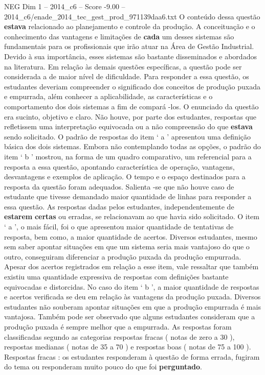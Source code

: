 \begin{textsample}{NEG Dim 1 – 2014\_c6 – Score -9.00 – 2014\_c6/enade\_2014\_tec\_gest\_prod\_971139daa6.txt}
O conteúdo dessa questão \textbf{estava} relacionado ao planejamento e controle da produção.
A conceituação e o conhecimento das vantagens e limitações de \textbf{cada} um desses sistemas são fundamentais para os profissionais que irão atuar na Área de Gestão Industrial.
Devido à sua importância, esses sistemas são bastante disseminados e abordados na literatura.
Em relação às demais questões específicas, a questão pode ser considerada a de maior nível de dificuldade.
Para responder a essa questão, os estudantes deveriam compreender o significado dos conceitos de produção puxada e empurrada, além conhecer a aplicabilidade, as características e o comportamento dos dois sistemas a fim de compará -los.
O enunciado da questão era sucinto, objetivo e claro.
Não houve, por parte dos estudantes, respostas que refletissem uma interpretação equivocada ou a não compreensão do que \textbf{estava} sendo solicitado.
O padrão de respostas do item ‘ a ’ apresentou uma definição básica dos dois sistemas.
Embora não contemplando todas as opções, o padrão do item ‘ b ’ mostrou, na forma de um quadro comparativo, um referencial para a resposta a essa questão, apontando característica de operação, vantagens, desvantagens e exemplos de aplicação.
O tempo e o espaço destinados para a resposta da questão foram adequados.
Salienta -se que não houve caso de estudante que tivesse demandado maior quantidade de linhas para responder a essa questão.
As respostas dadas pelos estudantes, independentemente de \textbf{estarem} \textbf{certas} ou erradas, se relacionavam ao que havia sido solicitado.
O item ‘ a ’, o mais fácil, foi o que apresentou maior quantidade de tentativas de resposta, bem como, a maior quantidade de acertos.
Diversos estudantes, mesmo sem saber apontar situações em que um sistema seria mais vantajoso do que o outro, conseguiram diferenciar a produção puxada da produção empurrada.
Apesar dos acertos registrados em relação a esse item, vale ressaltar que também existiu uma quantidade expressiva de respostas com definições bastante equivocadas e distorcidas.
No caso do item ‘ b ’, a maior quantidade de respostas e acertos verificada se deu em relação às vantagens da produção puxada.
Diversos estudantes não souberam apontar situações em que a produção empurrada é mais vantajosa.
Também pode ser observado que alguns estudantes consideram que a produção puxada é sempre melhor que a empurrada.
As respostas foram classificadas segundo as categorias respostas fracas ( notas de zero a 30 ), respostas medianas ( notas de 35 a 70 ) e respostas boas ( notas de 75 a 100 ).
Respostas fracas : os estudantes responderam à questão de forma errada, fugiram do tema ou responderam muito pouco do que foi \textbf{perguntado}.

\end{textsample}
